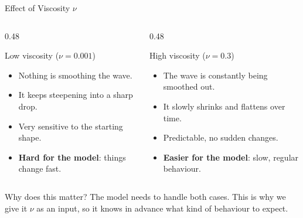 \begin{frame}{\Large Effect of Viscosity $\nu$}
\vspace{-1.2em}
  \begin{columns}[t]
    \begin{column}{0.48\textwidth}
      \begin{block}{\centering Low viscosity ($\nu = 0.001$)}
        \begin{itemize}\setlength\itemsep{4pt}
          \item Nothing is smoothing the wave.
          \item It keeps steepening into a sharp drop.
          \item Very sensitive to the starting shape.
          \item \textbf{Hard for the model}: things change fast.
        \end{itemize}
      \end{block}
    \end{column}
    \begin{column}{0.48\textwidth}
      \begin{block}{\centering High viscosity ($\nu = 0.3$)}
        \begin{itemize}\setlength\itemsep{4pt}
          \item The wave is constantly being smoothed out.
          \item It slowly shrinks and flattens over time.
          \item Predictable, no sudden changes.
          \item \textbf{Easier for the model}: slow, regular behaviour.
        \end{itemize}
      \end{block}
    \end{column}
  \end{columns}

  \vspace{0.2em}

  \begin{alertblock}{Why does this matter?}
    The model needs to handle both cases. This is why we give it
    $\nu$ as an input, so it knows in advance what kind of
    behaviour to expect.
  \end{alertblock}

\end{frame}

